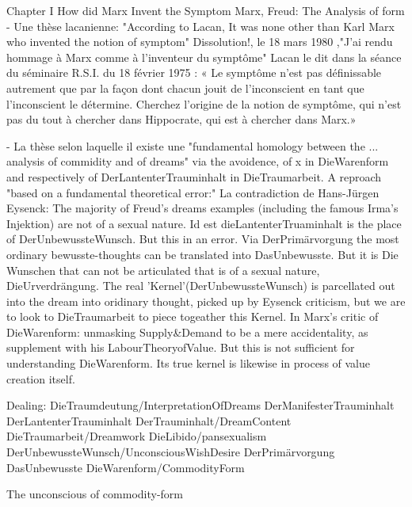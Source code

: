 
Chapter I How did Marx Invent the Symptom
Marx, Freud: The Analysis of form
- Une thèse lacanienne: "According to Lacan, It was none other than Karl Marx who invented the notion of symptom"
Dissolution!, le 18 mars 1980 ,"J’ai rendu hommage à Marx comme à l’inventeur du symptôme"
Lacan le dit dans la séance du séminaire R.S.I. du 18 février 1975 : « Le symptôme n’est pas définissable autrement que par la façon dont chacun jouit de l’inconscient en tant que l’inconscient le détermine. Cherchez l’origine de la notion de symptôme, qui n’est pas du tout à chercher dans Hippocrate, qui est à chercher dans Marx.»

- La thèse selon laquelle il existe une "fundamental homology between the ... analysis of commidity and of dreams" via the avoidence, of x in DieWarenform and respectively of DerLantenterTrauminhalt in DieTraumarbeit.
A reproach "based on a fundamental theoretical error:" La contradiction de Hans-Jürgen Eysenck: The majority of Freud's dreams examples (including the famous Irma's Injektion) are not of a sexual nature. Id est dieLantenterTruaminhalt is the place of DerUnbewussteWunsch. But this in an error. Via DerPrimärvorgung the most ordinary bewusste-thoughts can be translated into DasUnbewusste. But it is Die Wunschen that can not be articulated that is of a sexual nature, DieUrverdrängung. 
The real 'Kernel'(DerUnbewussteWunsch) is parcellated out into the dream into oridinary thought, picked up by Eysenck criticism, but we are to look to DieTraumarbeit to piece togeather this Kernel.
In Marx's critic of DieWarenform: unmasking Supply&Demand to be a mere accidentality, as supplement with his LabourTheoryofValue. But this is not sufficient for understanding DieWarenform. Its true kernel is likewise in process of value creation itself.


Dealing: DieTraumdeutung/InterpretationOfDreams DerManifesterTrauminhalt DerLantenterTrauminhalt DerTrauminhalt/DreamContent DieTraumarbeit/Dreamwork DieLibido/pansexualism DerUnbewussteWunsch/UnconsciousWishDesire DerPrimärvorgung DasUnbewusste
 DieWarenform/CommodityForm 


The unconscious of commodity-form
